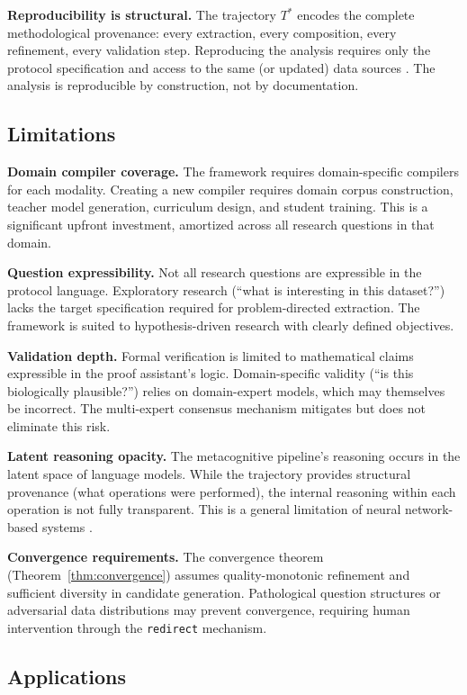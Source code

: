 \documentclass[10pt,twocolumn]{article}
\theoremstyle{definition}
\theoremstyle{remark}
\begin{document}
\textbf{Reproducibility is structural.} The trajectory $T^*$ encodes the complete methodological provenance: every extraction, every composition, every refinement, every validation step. Reproducing the analysis requires only the protocol specification and access to the same (or updated) data sources \cite{wilkinson2016fair}. The analysis is reproducible by construction, not by documentation.

\subsection{Limitations}

\textbf{Domain compiler coverage.} The framework requires domain-specific compilers for each modality. Creating a new compiler requires domain corpus construction, teacher model generation, curriculum design, and student training. This is a significant upfront investment, amortized across all research questions in that domain.

\textbf{Question expressibility.} Not all research questions are expressible in the protocol language. Exploratory research (``what is interesting in this dataset?'') lacks the target specification required for problem-directed extraction. The framework is suited to hypothesis-driven research with clearly defined objectives.

\textbf{Validation depth.} Formal verification is limited to mathematical claims expressible in the proof assistant's logic. Domain-specific validity (``is this biologically plausible?'') relies on domain-expert models, which may themselves be incorrect. The multi-expert consensus mechanism mitigates but does not eliminate this risk.

\textbf{Latent reasoning opacity.} The metacognitive pipeline's reasoning occurs in the latent space of language models. While the trajectory provides structural provenance (what operations were performed), the internal reasoning within each operation is not fully transparent. This is a general limitation of neural network-based systems \cite{brown2020}.

\textbf{Convergence requirements.} The convergence theorem (Theorem~\ref{thm:convergence}) assumes quality-monotonic refinement and sufficient diversity in candidate generation. Pathological question structures or adversarial data distributions may prevent convergence, requiring human intervention through the \texttt{redirect} mechanism.

\subsection{Applications}
\end{document}
